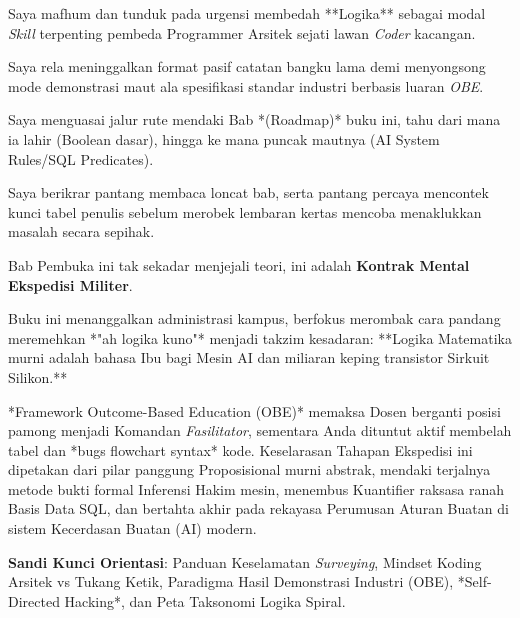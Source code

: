 \documentclass[../main]{subfiles}
\begin{document}
\begin{checklist}
  \item Saya mafhum dan tunduk pada urgensi membedah **Logika** sebagai modal \textit{Skill} terpenting pembeda Programmer Arsitek sejati lawan \textit{Coder} kacangan.
  \item Saya rela meninggalkan format pasif catatan bangku lama demi menyongsong mode demonstrasi maut ala spesifikasi standar industri berbasis luaran \textit{OBE}.
  \item Saya menguasai jalur rute mendaki Bab *(Roadmap)* buku ini, tahu dari mana ia lahir (Boolean dasar), hingga ke mana puncak mautnya (AI System Rules/SQL Predicates).
  \item Saya berikrar pantang membaca loncat bab, serta pantang percaya mencontek kunci tabel penulis sebelum merobek lembaran kertas mencoba menaklukkan masalah secara sepihak.
\end{checklist}

\begin{rangkuman}
Bab Pembuka ini tak sekadar menjejali teori, ini adalah \textbf{Kontrak Mental Ekspedisi Militer}. 

Buku ini menanggalkan administrasi kampus, berfokus merombak cara pandang meremehkan *"ah logika kuno"* menjadi takzim kesadaran: **Logika Matematika murni adalah bahasa Ibu bagi Mesin AI dan miliaran keping transistor Sirkuit Silikon.** 

*Framework Outcome-Based Education (OBE)* memaksa Dosen berganti posisi pamong menjadi Komandan \textit{Fasilitator}, sementara Anda dituntut aktif membelah tabel dan *bugs flowchart syntax* kode. Keselarasan Tahapan Ekspedisi ini dipetakan dari pilar panggung Proposisional murni abstrak, mendaki terjalnya metode bukti formal Inferensi Hakim mesin, menembus Kuantifier raksasa ranah Basis Data SQL, dan bertahta akhir pada rekayasa Perumusan Aturan Buatan di sistem Kecerdasan Buatan (AI) modern.

\textbf{Sandi Kunci Orientasi}: Panduan Keselamatan \textit{Surveying}, Mindset Koding Arsitek vs Tukang Ketik, Paradigma Hasil Demonstrasi Industri (OBE), *Self-Directed Hacking*, dan Peta Taksonomi Logika Spiral.
\end{rangkuman}

\ifSubfilesClassLoaded{
  \renewcommand{\bibname}{Daftar Pustaka}
  
  
}{}
\end{document}
